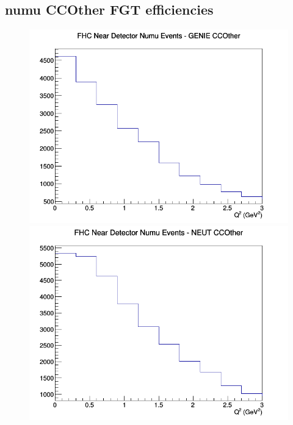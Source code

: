 \documentclass[12pt]{article}
\begin{document}
\subsection{numu CCOther FGT efficiencies}
\begin{figure}[h]
\includegraphics[width=\linewidth]{eff_Q2/FGT/CCOther_FHC_ND_numu_Q2_GENIE.png}
\endminipage
{}
\includegraphics[width=\linewidth]{eff_Q2/FGT/CCOther_FHC_ND_numu_Q2_NEUT.png}
\endminipage
{}

\end{figure}
\end{document}
